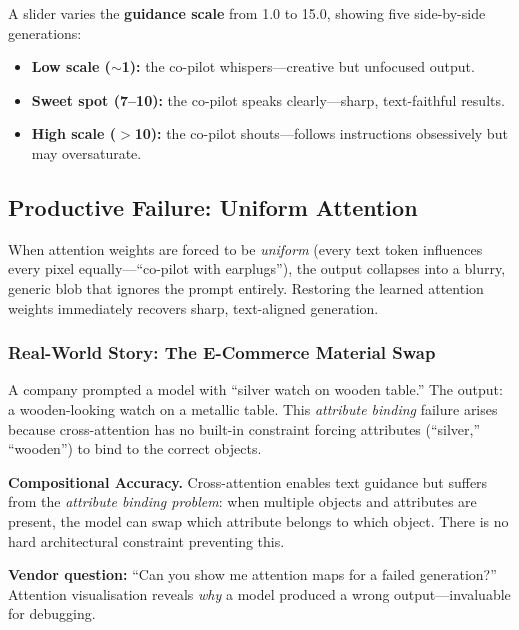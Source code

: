 \documentclass[11pt,a4paper]{article}
\begin{document}
A slider varies the \textbf{guidance scale} from 1.0 to 15.0, showing
five side-by-side generations:

\begin{itemize}[nosep]
  \item \textbf{Low scale ($\sim$1):} the co-pilot whispers---creative
        but unfocused output.
  \item \textbf{Sweet spot (7--10):} the co-pilot speaks clearly---sharp,
        text-faithful results.
  \item \textbf{High scale ($>$10):} the co-pilot shouts---follows
        instructions obsessively but may oversaturate.
\end{itemize}

\subsection{Productive Failure: Uniform Attention}

When attention weights are forced to be \emph{uniform} (every text token
influences every pixel equally---``co-pilot with earplugs''), the output
collapses into a blurry, generic blob that ignores the prompt entirely.
Restoring the learned attention weights immediately recovers sharp,
text-aligned generation.

\subsubsection*{Real-World Story: The E-Commerce Material Swap}

A company prompted a model with ``silver watch on wooden table.''  The
output: a wooden-looking watch on a metallic table.  This
\emph{attribute binding} failure arises because cross-attention has no
built-in constraint forcing attributes (``silver,'' ``wooden'') to bind
to the correct objects.

\begin{managerbox}
\textbf{Compositional Accuracy.}  Cross-attention enables text guidance
but suffers from the \emph{attribute binding problem}: when multiple
objects and attributes are present, the model can swap which attribute
belongs to which object.  There is no hard architectural constraint
preventing this.

\textbf{Vendor question:} ``Can you show me attention maps for a failed
generation?''  Attention visualisation reveals \emph{why} a model
produced a wrong output---invaluable for debugging.
\end{managerbox}
\end{document}
